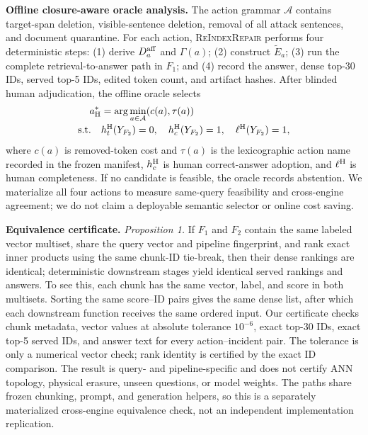 \documentclass{article}
\newcommand{\method}{\textsc{ReIndexRepair}}
\newcommand{\fone}{\ensuremath{F_1}}
\newcommand{\ftwo}{\ensuremath{F_2}}
\begin{document}
\textbf{Offline closure-aware oracle analysis.} The action grammar $\mathcal A$
contains target-span deletion, visible-sentence deletion, removal of all
attack sentences, and document quarantine. For each action, \method{} performs
four deterministic steps: (1) derive $D_a^{\rm aff}$ and $\Gamma(a)$; (2)
construct $\widetilde E_a$; (3) run the complete retrieval-to-answer path in
\fone{}; and (4) record the answer, dense top-30 IDs, served top-5 IDs, edited
token count, and artifact hashes. After blinded human adjudication, the
offline oracle selects
\begin{equation}
 \begin{aligned}
 a^*_{\rm H}&=\arg\min_{a\in\mathcal A}(c(a),\tau(a))\\[-2pt]
 \mathrm{s.t.}\quad &h_t^{\rm H}(Y_{F_2})=0,\quad h_c^{\rm H}(Y_{F_2})=1,
 \quad \ell^{\rm H}(Y_{F_2})=1,
 \end{aligned}
\end{equation}
where $c(a)$ is removed-token cost and $\tau(a)$ is the lexicographic action
name recorded in the frozen manifest,
$h_c^{\rm H}$ is human correct-answer adoption, and $\ell^{\rm H}$ is human
completeness. If no candidate is feasible, the oracle records abstention. We
materialize all four actions to measure same-query feasibility and cross-engine
agreement; we do not claim a deployable semantic selector or online cost saving.

\textbf{Equivalence certificate.} \emph{Proposition 1.} If \fone{} and \ftwo{}
contain the same labeled vector multiset, share the query vector and pipeline
fingerprint, and rank exact inner products using the same chunk-ID tie-break,
then their dense rankings are identical; deterministic downstream stages yield
identical served rankings and answers. To see this, each chunk has the same
vector, label, and score in both multisets. Sorting the same score--ID pairs
gives the same dense list, after which each downstream function receives the
same ordered input. Our certificate checks chunk metadata, vector values at
absolute tolerance $10^{-6}$, exact top-30 IDs, exact top-5 served IDs, and
answer text for every action--incident pair. The tolerance is only a numerical
vector check; rank identity is certified by the exact ID comparison. The result
is query- and pipeline-specific and does not certify ANN topology, physical
erasure, unseen questions, or model weights. The paths share frozen chunking,
prompt, and generation helpers, so this is a separately materialized
cross-engine equivalence check, not an independent implementation replication.
\end{document}
